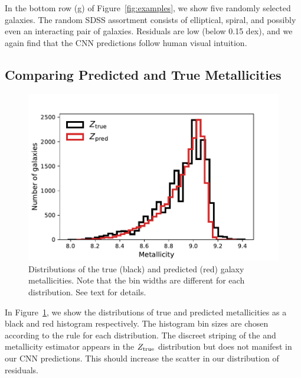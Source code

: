 \documentclass[fleqn,usenatbib]{mnras}
\begin{document}
In the bottom row (g) of Figure~\ref{fig:examples}, we show five randomly selected galaxies. The random SDSS assortment consists of elliptical, spiral, and possibly even an interacting pair of galaxies. Residuals are low (below 0.15 dex), and we again find that the CNN predictions follow human visual intuition.

\subsection{Comparing Predicted and True Metallicities}
\begin{figure}
	\includegraphics[width=\columnwidth]{03-Z_distribution.pdf}
	\caption{\label{fig:distributions}
		Distributions of the true (black) and predicted (red) galaxy metallicities. Note that the bin widths are different for each distribution. See text for details.}
\end{figure}

In Figure~\ref{fig:distributions}, we show the distributions of true and predicted metallicities as a black and red histogram respectively. The histogram bin sizes are chosen according to the \cite{Freedman1981} rule for each distribution. The discreet striping of the \cite{Tremonti2004} and \cite{Brinchmann2004} metallicity estimator appears in the $Z_{\rm true}$ distribution but does not manifest in our CNN predictions. This should increase the scatter in our distribution of residuals.

\end{document}
